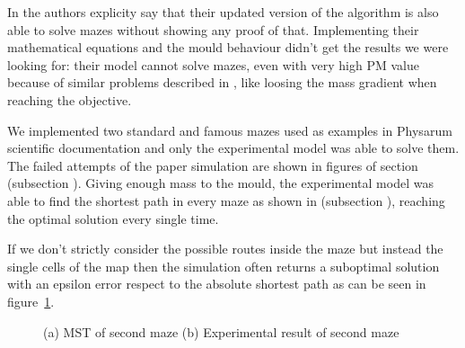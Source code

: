 \par
In \cite{Tsompanas2016} the authors explicity say that their updated version of the algorithm is also able to solve mazes without showing any proof of that. Implementing their mathematical equations and the mould behaviour didn't get the results we were looking for: their model cannot solve mazes, even with very high PM value because of similar problems described in , like loosing the mass gradient when reaching the objective.

\par
We implemented two standard and famous mazes used as examples in Physarum scientific documentation and only the experimental model was able to solve them. The failed attempts of the paper simulation are shown in figures of section  (subsection ).
Giving enough mass to the mould, the experimental model was able to find the shortest path in every maze as shown in  (subsection ), reaching the optimal solution every single time.

\par
If we don't strictly consider the possible routes inside the maze but instead the single cells of the map then the simulation often returns a suboptimal solution with an epsilon error respect to the absolute shortest path as can be seen in figure~\ref{fig:mst_tube}.

\begin{figure}[H]
    \centering
    \caption{(a) MST of second maze (b) Experimental result of second maze}
    \label{fig:mst_tube}
\end{figure}

